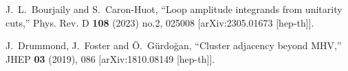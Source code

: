 \documentclass[12pt]{article}
\numberwithin{equation}{section}
\begin{document}
\begin{thebibliography}{}
J.~L.~Bourjaily and S.~Caron-Huot,
``Loop amplitude integrands from unitarity cuts,''
Phys. Rev. D \textbf{108} (2023) no.2, 025008
[arXiv:2305.01673 [hep-th]].

J.~Drummond, J.~Foster and {\"O}.~G{\"u}rdo{\u{g}}an,
``Cluster adjacency beyond MHV,''
JHEP \textbf{03} (2019), 086
[arXiv:1810.08149 [hep-th]].

\end{thebibliography}
\end{document}

